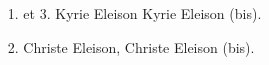  \begin{itemize}
	  \item[1. et 3.] Kyrie Eleison Kyrie Eleison (bis).
	  \item[2.] Christe Eleison, Christe Eleison (bis).
 \end{itemize}
